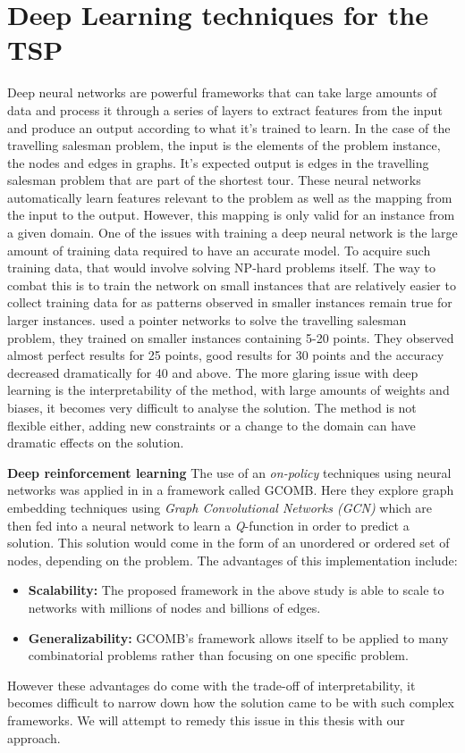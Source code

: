 \documentclass[]{UCD_CS_FYP_Report}
\begin{document}
\section{Deep Learning techniques for the TSP}
Deep neural networks are powerful frameworks that can take large amounts of data and process it through a series of layers to extract features from the input and produce an output according to what it’s trained to learn. In the case of the travelling salesman problem, the input is the elements of the problem instance, the nodes and edges in graphs. It’s expected output is edges in the travelling salesman problem that are part of the shortest tour. These neural networks automatically learn features relevant to the problem as well as the mapping from the input to the output. However, this mapping is only valid for an instance from a given domain. One of the issues with training a deep neural network is the large amount of training data required to have an accurate model. To acquire such training data, that would involve solving NP-hard problems itself. The way to combat this is to train the network on small instances that are relatively easier to collect training data for as patterns observed in smaller instances remain true for larger instances. \cite{NIPS2015_5866} used a pointer networks to solve the travelling salesman problem, they trained on smaller instances containing 5-20 points. They observed almost perfect results for 25 points, good results for 30 points and the accuracy decreased dramatically for 40 and above. The more glaring issue with deep learning is the interpretability of the method, with large amounts of weights and biases, it becomes very difficult to analyse the solution. The method is not flexible either, adding new constraints or a change to the domain can have dramatic effects on the solution.

\textbf{Deep reinforcement learning}
The use of an \textit{on-policy} techniques using neural networks was applied in \cite{DeepRL} in a framework called \textsc{GCOMB}. Here they explore graph embedding techniques using \textit{Graph Convolutional Networks (GCN)} which are then fed into a neural network to learn a \textit{Q}-function in order to predict a solution. This solution would come in the form of an unordered or ordered set of nodes, depending on the problem. The advantages of this implementation include: 
\begin{itemize}
  \item \textbf{Scalability: }The proposed framework in the above study is able to scale to networks with millions of nodes and billions of edges.
  \item \textbf{Generalizability: }\textsc{GCOMB}'s framework allows itself to be applied to many combinatorial problems rather than focusing on one specific problem.
\end{itemize}
However these advantages do come with the trade-off of interpretability, it becomes difficult to narrow down how the solution came to be with such complex frameworks. We will attempt to remedy this issue in this thesis with our approach.
\end{document}
